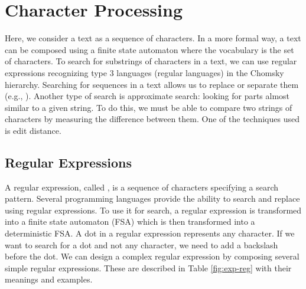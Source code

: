 \documentclass{KBook}
\begin{document}
\section{Character Processing}

Here, we consider a text as a sequence of characters. 
In a more formal way, a text can be composed using a finite state automaton where the vocabulary is the set of characters. 
To search for substrings of characters in a text, we can use regular expressions recognizing type 3 languages (regular languages) in the Chomsky hierarchy. 
Searching for sequences in a text allows us to replace or separate them (e.g., ). 
Another type of search is approximate search: looking for parts almost similar to a given string. 
To do this, we must be able to compare two strings of characters by measuring the difference between them. 
One of the techniques used is edit distance.

\subsection{Regular Expressions}

A regular expression, called , is a sequence of characters specifying a search pattern.
Several programming languages provide the ability to search and replace using regular expressions. 
To use it for search, a regular expression is transformed into a finite state automaton (FSA) which is then transformed into a deterministic FSA.
A dot in a regular expression represents any character.
If we want to search for a dot and not any character, we need to add a backslash before the dot.
We can design a complex regular expression by composing several simple regular expressions.
These are described in Table \ref{fig:exp-reg} with their meanings and examples.
\end{document}
